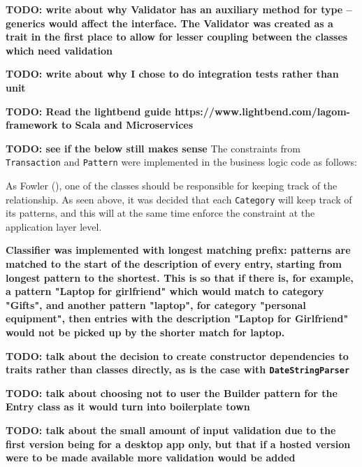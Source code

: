 \textbf{TODO: write about why Validator has an auxiliary method for type --
generics would affect the interface. The Validator was created as a trait in
the first place to allow for lesser coupling between the classes which need
validation}

\textbf{TODO: write about why I chose to do integration tests rather than unit}

\textbf{TODO: Read the lightbend guide
https://www.lightbend.com/lagom-framework to Scala and Microservices}

\textbf{TODO: see if the below still makes sense}
The constraints from \texttt{Transaction} and \texttt{Pattern} were implemented
in the business logic code as follows:
{
  \small
  
}

{
  \small
  
}

As Fowler (\citeyear[][]{fowler1997analysis}), one of the classes should be
responsible for keeping track of the relationship. As seen above, it was
decided that each \texttt{Category} will keep track of its patterns, and this
will at the same time enforce the constraint at the application layer level.


\textbf{Classifier was implemented with longest matching prefix: patterns are
matched to the start of the description of every entry, starting from longest
pattern to the shortest. This is so that if there is, for example, a pattern
"Laptop for girlfriend" which would match to category "Gifts", and another
pattern "laptop", for category "personal equipment", then entries with the
description "Laptop for Girlfriend" would not be picked up by the shorter match
for laptop.}

\textbf{TODO: talk about the decision to create constructor dependencies to
traits rather than classes directly, as is the case with
\texttt{DateStringParser}}

\textbf{TODO: talk about choosing not to user the Builder pattern for the Entry
class as it would turn into boilerplate town}

\textbf{TODO: talk about the small amount of input validation due to the first
version being for a desktop app only, but that if a hosted version were to be
made available more validation would be added}

